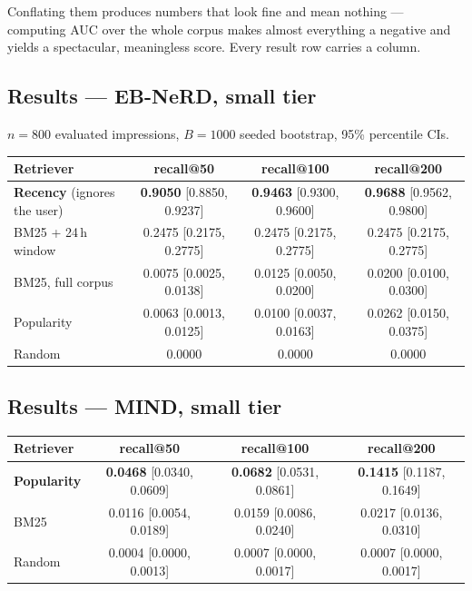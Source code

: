 \documentclass[11pt,a4paper]{article}
\newcommand{\brk}[1]{%
  \begingroup\ttfamily\hyphenchar\font=-1
  \discretionary{}{}{}%
  \expandafter\brkscan\detokenize{#1}\relax\endgroup}
\def\brkscan#1{%
  \ifx#1\relax\else
    \char`#1%
    \ifnum`#1=`/ \penalty0 \fi
    \ifnum`#1=`_ \penalty0 \fi
    \ifnum`#1=`. \penalty0 \fi
    \expandafter\brkscan
  \fi}
\begin{document}
Conflating them produces numbers that look fine and mean nothing --- computing AUC over the whole
corpus makes almost everything a negative and yields a spectacular, meaningless score. Every result
row carries a \brk{regime} column.

\subsection{Results --- EB-NeRD, small tier}

$n=800$ evaluated impressions, $B=1000$ seeded bootstrap, 95\% percentile CIs.

\begin{center}\small
\begin{tabular}{lccc}
\toprule
Retriever & recall@50 & recall@100 & recall@200 \\
\midrule
\textbf{Recency} (ignores the user) & \textbf{0.9050} [0.8850, 0.9237] & \textbf{0.9463} [0.9300, 0.9600] & \textbf{0.9688} [0.9562, 0.9800] \\
BM25 + 24\,h window & 0.2475 [0.2175, 0.2775] & 0.2475 [0.2175, 0.2775] & 0.2475 [0.2175, 0.2775] \\
BM25, full corpus & 0.0075 [0.0025, 0.0138] & 0.0125 [0.0050, 0.0200] & 0.0200 [0.0100, 0.0300] \\
Popularity & 0.0063 [0.0013, 0.0125] & 0.0100 [0.0037, 0.0163] & 0.0262 [0.0150, 0.0375] \\
Random & 0.0000 & 0.0000 & 0.0000 \\
\bottomrule
\end{tabular}
\end{center}

\subsection{Results --- MIND, small tier}

\begin{center}\small
\begin{tabular}{lccc}
\toprule
Retriever & recall@50 & recall@100 & recall@200 \\
\midrule
\textbf{Popularity} & \textbf{0.0468} [0.0340, 0.0609] & \textbf{0.0682} [0.0531, 0.0861] & \textbf{0.1415} [0.1187, 0.1649] \\
BM25 & 0.0116 [0.0054, 0.0189] & 0.0159 [0.0086, 0.0240] & 0.0217 [0.0136, 0.0310] \\
Random & 0.0004 [0.0000, 0.0013] & 0.0007 [0.0000, 0.0017] & 0.0007 [0.0000, 0.0017] \\
\bottomrule
\end{tabular}
\end{center}
\end{document}
